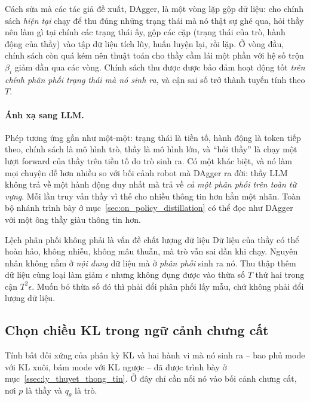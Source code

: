 Cách sửa mà các tác giả đề xuất, DAgger, là một vòng lặp gộp dữ liệu: cho chính sách \emph{hiện tại} chạy để thu đúng những trạng thái mà nó thật sự ghé qua, hỏi thầy nên làm gì tại chính các trạng thái ấy, gộp các cặp (trạng thái của trò, hành động của thầy) vào tập dữ liệu tích lũy, huấn luyện lại, rồi lặp. Ở vòng đầu, chính sách còn quá kém nên thuật toán cho thầy cầm lái một phần với hệ số trộn $\beta_i$ giảm dần qua các vòng. Chính sách thu được được bảo đảm hoạt động tốt \emph{trên chính phân phối trạng thái mà nó sinh ra}, và cận sai số trở thành tuyến tính theo $T$.

\paragraph{Ánh xạ sang LLM.} Phép tương ứng gần như một-một: trạng thái là tiền tố, hành động là token tiếp theo, chính sách là mô hình trò, thầy là mô hình lớn, và ``hỏi thầy'' là chạy một lượt forward của thầy trên tiền tố do trò sinh ra. Có một khác biệt, và nó làm mọi chuyện dễ hơn nhiều so với bối cảnh robot mà DAgger ra đời: thầy LLM không trả về một hành động duy nhất mà trả về \emph{cả một phân phối trên toàn từ vựng}. Mỗi lần truy vấn thầy vì thế cho nhiều thông tin hơn hẳn một nhãn. Toàn bộ nhánh trình bày ở mục~\ref{sec:on_policy_distillation} có thể đọc như DAgger với một ông thầy giàu thông tin hơn.

\begin{pitfall}{Lệch phân phối không phải là vấn đề chất lượng dữ liệu}
Dữ liệu của thầy có thể hoàn hảo, không nhiễu, không mâu thuẫn, mà trò vẫn sai dần khi chạy. Nguyên nhân không nằm ở \emph{nội dung} dữ liệu mà ở \emph{phân phối} sinh ra nó. Thu thập thêm dữ liệu cùng loại làm giảm $\epsilon$ nhưng không đụng được vào thừa số $T$ thứ hai trong cận $T^2\epsilon$. Muốn bỏ thừa số đó thì phải đổi phân phối lấy mẫu, chứ không phải đổi lượng dữ liệu.
\end{pitfall}

\subsection{Chọn chiều KL trong ngữ cảnh chưng cất}
\label{ssec:kl_direction_distillation}

Tính bất đối xứng của phân kỳ KL và hai hành vi mà nó sinh ra -- bao phủ mode với KL xuôi, bám mode với KL ngược -- đã được trình bày ở mục~\ref{ssec:ly_thuyet_thong_tin}. Ở đây chỉ cần nối nó vào bối cảnh chưng cất, nơi $p$ là thầy và $q_\theta$ là trò.

